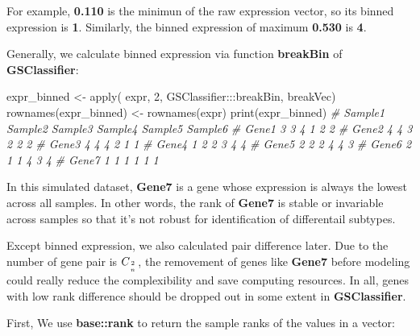 \documentclass[
  12pt,
]{book}
\newenvironment{Shaded}{\begin{snugshade}}{\end{snugshade}}
\newcommand{\CommentTok}[1]{\textcolor[rgb]{0.56,0.35,0.01}{\textit{#1}}}
\newcommand{\DecValTok}[1]{\textcolor[rgb]{0.00,0.00,0.81}{#1}}
\newcommand{\FunctionTok}[1]{\textcolor[rgb]{0.00,0.00,0.00}{#1}}
\newcommand{\NormalTok}[1]{#1}
\newcommand{\OtherTok}[1]{\textcolor[rgb]{0.56,0.35,0.01}{#1}}
\newcommand{\SpecialCharTok}[1]{\textcolor[rgb]{0.00,0.00,0.00}{#1}}
\begin{document}
For example, \textbf{0.110} is the minimun of the raw expression vector, so its binned expression is \textbf{1}. Similarly, the binned expression of maximum \textbf{0.530} is \textbf{4}.

Generally, we calculate binned expression via function \textbf{breakBin} of \textbf{GSClassifier}:

\begin{Shaded}
\begin{Highlighting}[]
\NormalTok{expr\_binned }\OtherTok{\textless{}{-}} \FunctionTok{apply}\NormalTok{(}
\NormalTok{  expr, }\DecValTok{2}\NormalTok{, }
\NormalTok{  GSClassifier}\SpecialCharTok{:::}\NormalTok{breakBin,}
\NormalTok{  breakVec)}
\FunctionTok{rownames}\NormalTok{(expr\_binned) }\OtherTok{\textless{}{-}} \FunctionTok{rownames}\NormalTok{(expr)}
\FunctionTok{print}\NormalTok{(expr\_binned)}
\CommentTok{\#       Sample1 Sample2 Sample3 Sample4 Sample5 Sample6}
\CommentTok{\# Gene1       3       3       4       1       2       2}
\CommentTok{\# Gene2       4       4       3       2       2       2}
\CommentTok{\# Gene3       4       4       4       2       1       1}
\CommentTok{\# Gene4       1       2       2       3       4       4}
\CommentTok{\# Gene5       2       2       2       4       4       3}
\CommentTok{\# Gene6       2       1       1       4       3       4}
\CommentTok{\# Gene7       1       1       1       1       1       1}
\end{Highlighting}
\end{Shaded}

In this simulated dataset, \textbf{Gene7} is a gene whose expression is always the lowest across all samples. In other words, the rank of \textbf{Gene7} is stable or invariable across samples so that it's not robust for identification of differentail subtypes.

Except binned expression, we also calculated pair difference later. Due to the number of gene pair is \(C_{2 \atop n}\), the removement of genes like \textbf{Gene7} before modeling could really reduce the complexibility and save computing resources. In all, genes with low rank difference should be dropped out in some extent in \textbf{GSClassifier}.

First, We use \textbf{base::rank} to return the sample ranks of the values in a vector:
\end{document}
